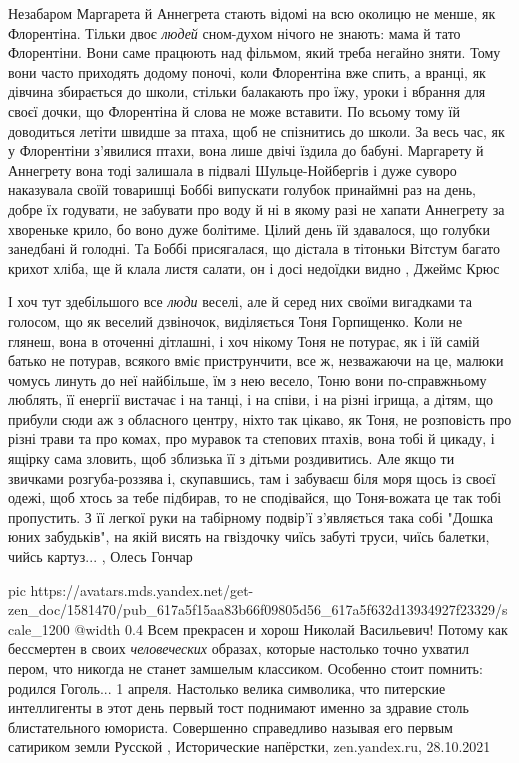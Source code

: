 Незабаром Маргарета й Аннегрета стають відомі на всю околицю не менше, як
Флорентіна. Тільки двоє \emph{людей} сном-духом нічого не знають: мама й тато
Флорентіни.  Вони саме працюють над фільмом, який треба негайно зняти. Тому
вони часто приходять додому поночі, коли Флорентіна вже спить, а вранці, як
дівчина збирається до школи, стільки балакають про їжу, уроки і вбрання для
своєї дочки, що Флорентіна й слова не може вставити. По всьому тому їй
доводиться летіти швидше за птаха, щоб не спізнитись до школи.  За весь час, як
у Флорентіни з'явилися птахи, вона лише двічі їздила до бабуні.  Маргарету й
Аннегрету вона тоді залишала в підвалі Шульце-Нойбергів і дуже суворо
наказувала своїй товаришці Боббі випускати голубок принаймні раз на день, добре
їх годувати, не забувати про воду й ні в якому разі не хапати Аннегрету за
хвореньке крило, бо воно дуже болітиме.  Цілий день їй здавалося, що голубки
занедбані й голодні.  Та Боббі присягалася, що дістала в тітоньки Вітстум
багато крихот хліба, ще й клала листя салати, он і досі недоїдки видно
, Джеймс Крюс

І хоч тут здебільшого все \emph{люди} веселі, але й серед них своїми вигадками та
голосом, що як веселий дзвіночок, виділяється Тоня Горпищенко. Коли не глянеш,
вона в оточенні дітлашні, і хоч нікому Тоня не потурає, як і їй самій батько не
потурав, всякого вміє приструнчити, все ж, незважаючи на це, малюки чомусь
линуть до неї найбільше, їм з нею весело, Тоню вони по-справжньому люблять, її
енергії вистачає і на танці, і на співи, і на різні ігрища, а дітям, що прибули
сюди аж з обласного центру, ніхто так цікаво, як Тоня, не розповість про різні
трави та про комах, про муравок та степових птахів, вона тобі й цикаду, і
ящірку сама зловить, щоб зблизька її з дітьми роздивитись. Але якщо ти звичками
розгуба-роззява і, скупавшись, там і забуваєш біля моря щось із своєї одежі,
щоб хтось за тебе підбирав, то не сподівайся, що Тоня-вожата це так тобі
пропустить. З її легкої руки на табірному подвір'ї з'являється така собі "Дошка
юних забудьків", на якій висять на гвіздочку чиїсь забуті труси, чиїсь балетки,
чийсь картуз...
, Олесь Гончар

\ifcmt
  pic https://avatars.mds.yandex.net/get-zen_doc/1581470/pub_617a5f15aa83b66f09805d56_617a5f632d13934927f23329/scale_1200
  @width 0.4
\fi
Всем прекрасен и хорош Николай Васильевич! Потому как бессмертен в своих
\emph{человеческих} образах, которые настолько точно ухватил пером, что никогда не
станет замшелым классиком. Особенно стоит помнить: родился Гоголь... 1 апреля.
Настолько велика символика, что питерские интеллигенты в этот день первый тост
поднимают именно за здравие столь блистательного юмориста. Совершенно
справедливо называя его первым сатириком земли Русской
, 
Исторические напёрстки, zen.yandex.ru, 28.10.2021

